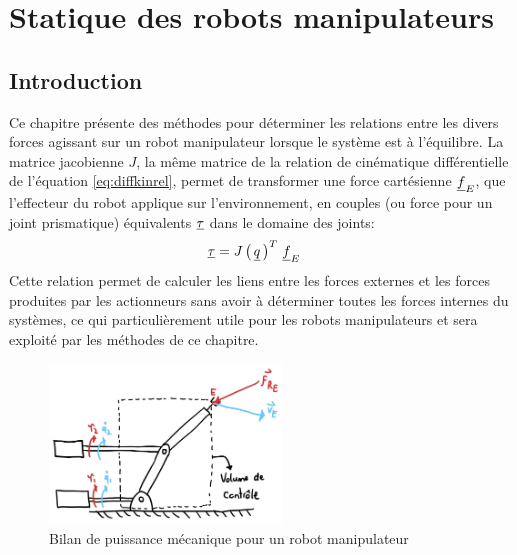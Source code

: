 \chapter{Statique des robots manipulateurs}
\label{sec:static}


\section{Introduction}

Ce chapitre présente des méthodes pour déterminer les relations entre les divers forces agissant sur un robot manipulateur lorsque le système est à l'équilibre. La matrice jacobienne $J$, la même matrice de la relation de cinématique différentielle de l'équation \ref{eq:diffkinrel}, permet de transformer une force cartésienne $\underline{f}_E$, que l'effecteur du robot applique sur l'environnement, en couples (ou force pour un joint prismatique) équivalents $\underline{\tau}$ dans le domaine des joints:
\begin{align}
\underline{\tau} &= J\left( \, \underline{q} \, \right)^T \, \underline{f}_E
\label{eq:static1}
\end{align}
Cette relation permet de calculer les liens entre les forces externes et les forces produites par les actionneurs sans avoir à déterminer toutes les forces internes du systèmes, ce qui particulièrement utile pour les robots manipulateurs et sera exploité par les méthodes de ce chapitre. 
\begin{figure}[H]
	\centering
		\includegraphics[width=0.55\textwidth]{fig/controlvolume.jpg}
	\caption{Bilan de puissance mécanique pour un robot manipulateur}
	\label{fig:controlvolume}
\end{figure}


